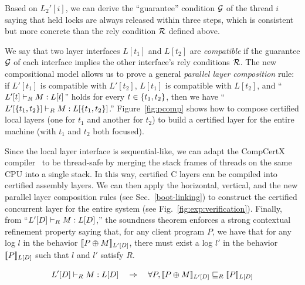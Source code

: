 Based on $L_2'[i]$, we can  derive the ``guarantee'' condition $\Guard$ of the thread $i$ saying that held locks are always released within three steps, which is consistent but more concrete than the rely condition $\Rely$ defined above.

We say that two layer interfaces $L[t_1]$ and $L[t_2]$ are {\em compatible} if the guarantee $\Guard$ of
each interface implies the other interface's rely conditions $\Rely$.  The new
compositional model allows us to prove a general {\em parallel layer
  composition} rule: if $L'[t_1]$ is compatible with $L'[t_2]$, $L[t_1]$ is compatible with $L[t_2]$, and
``$\ltyp{L'[t]}{R}{M}{L[t]}$'' holds for every $t\in \set{t_1,t_2}$, then we  have
``$\ltyp{L'[\set{t_1,t_2}]}{R}{M}{L[\set{t_1,t_2}]}$.'' Figure~\ref{fig:pcomp} shows how to compose
certified local layers (one for $t_1$ and another for $t_2$) to
build a certified layer for the entire machine (with $t_1$ and $t_2$
both focused).

Since the local layer interface is sequential-like, we can adapt the CompCertX compiler~\cite{deepspec} to be thread-safe by merging the stack frames of threads on the same CPU into a single stack. In this way, 
certified C layers can be compiled into certified assembly layers. We can then apply the horizontal, 
vertical, and the new parallel layer
composition rules (see Sec.~\ref{boot-linking}) to construct the certified concurrent layer for the entire system (see Fig.~\ref{fig:exp:verification}). Finally, from ``$\ltyp{L'[D]}{R}{M}{L[D]}$,'' the soundness theorem enforces a strong contextual refinement property saying that, for any client program $P$, we have that for any log $l$ in the behavior $\sem{L'[D]}{P \oplus M}$, there must exist a log $l'$ in the behavior $\sem{L[D]}{P}$
such that $l$ and $l'$ satisfy $R$.

\begin{theorem}[Soundness]
$$\ltyp{L'[D]}{R}{M}{L[D]} \quad\Rightarrow\quad \forall P, \sem{L'[D]}{P\oplus{}M} \refines_R \sem{L[D]}{P}$$
\end{theorem}


